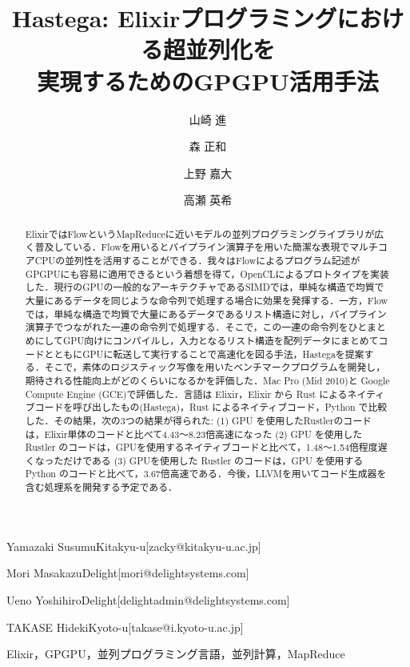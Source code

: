 \documentclass[submit,techrep]{ipsj}
\begin{document}
\title{Hastega: Elixirプログラミングにおける超並列化を\\実現するためのGPGPU活用手法}



\author{山崎 進}{Yamazaki Susumu}{Kitakyu-u}[zacky@kitakyu-u.ac.jp]
\author{森 正和}{Mori Masakazu}{Delight}[mori@delightsystems.com]
\author{上野 嘉大}{Ueno Yoshihiro}{Delight}[delightadmin@delightsystems.com]
\author{高瀬 英希}{TAKASE Hideki}{Kyoto-u}[takase@i.kyoto-u.ac.jp]

\begin{abstract}
ElixirではFlowというMapReduceに近いモデルの並列プログラミングライブラリが広く普及している．Flowを用いるとパイプライン演算子を用いた簡潔な表現でマルチコアCPUの並列性を活用することができる．我々はFlowによるプログラム記述がGPGPUにも容易に適用できるという着想を得て，OpenCLによるプロトタイプを実装した．現行のGPUの一般的なアーキテクチャであるSIMDでは，単純な構造で均質で大量にあるデータを同じような命令列で処理する場合に効果を発揮する．一方，Flowでは，単純な構造で均質で大量にあるデータであるリスト構造に対し，パイプライン演算子でつながれた一連の命令列で処理する．そこで，この一連の命令列をひとまとめにしてGPU向けにコンパイルし，入力となるリスト構造を配列データにまとめてコードとともにGPUに転送して実行することで高速化を図る手法，Hastegaを提案する．そこで，素体のロジスティック写像を用いたベンチマークプログラムを開発し，期待される性能向上がどのくらいになるかを評価した．Mac Pro (Mid 2010)と Google Compute Engine (GCE)で評価した．言語は Elixir，Elixir から Rust によるネイティブコードを呼び出したもの(Hastega)，Rust によるネイティブコード，Python で比較した．その結果，次の3つの結果が得られた: (1) GPU を使用したRustlerのコードは，Elixir単体のコードと比べて4.43〜8.23倍高速になった (2) GPU を使用した Rustler のコードは，GPUを使用するネイティブコードと比べて，1.48〜1.54倍程度遅くなっただけである (3) GPUを使用した Rustler のコードは，GPU を使用する Python のコードと比べて，3.67倍高速である．今後，LLVMを用いてコード生成器を含む処理系を開発する予定である．
\end{abstract}


\begin{jkeyword}
Elixir，GPGPU，並列プログラミング言語，並列計算，MapReduce
\end{jkeyword}
\end{document}
